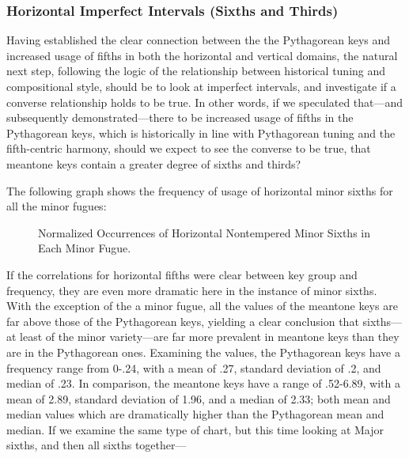     \subsubsection{Horizontal Imperfect Intervals (Sixths and
Thirds)}\label{horizontal-imperfect-intervals-sixths-and-thirds}

Having established the clear connection between the the Pythagorean keys
and increased usage of fifths in both the horizontal and vertical
domains, the natural next step, following the logic of the relationship
between historical tuning and compositional style, should be to look at
imperfect intervals, and investigate if a converse relationship holds to
be true. In other words, if we speculated that---and subsequently
demonstrated---there to be increased usage of fifths in the
Pythagorean keys, which is historically in line with Pythagorean tuning
and the fifth-centric harmony, should we expect to see the converse to
be true, that meantone keys contain a greater degree of sixths and
thirds?

The following graph shows the frequency of usage of horizontal minor
sixths for all the minor fugues:




\begin{figure}[H]
\vspace{1.5em}
    \centering
    \caption{Normalized Occurrences of Horizontal Nontempered Minor Sixths in Each Minor Fugue. }
\end{figure}    If the correlations for horizontal fifths were clear between key group
and frequency, they are even more dramatic here in the instance of minor
sixths. With the exception of the a minor fugue, all the values of the
meantone keys are far above those of the Pythagorean keys, yielding a
clear conclusion that sixths---at least of the minor
variety---are far more prevalent in meantone keys than they are in
the Pythagorean ones. Examining the values, the Pythagorean keys have a
frequency range from 0-.24, with a mean of .27, standard deviation of
.2, and median of .23. In comparison, the meantone keys have a range of
.52-6.89, with a mean of 2.89, standard deviation of 1.96, and a median
of 2.33; both mean and median values which are dramatically higher than
the Pythagorean mean and median. If we examine the same type of chart,
but this time looking at Major sixths, and then all sixths
together---



